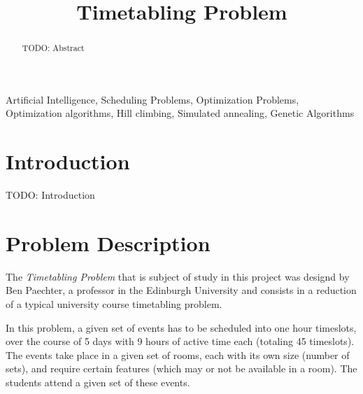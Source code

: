 \documentclass[conference]{IEEEtran}
\begin{document}
\title{Timetabling Problem}

\author{
\and
{}
\and
{}
}

\maketitle

\begin{abstract}
TODO: Abstract
\end{abstract}

\begin{IEEEkeywords}
Artificial Intelligence, Scheduling Problems, Optimization Problems, Optimization algorithms, Hill climbing, Simulated annealing, Genetic Algorithms
\end{IEEEkeywords}

\section{Introduction}

TODO: Introduction

\section{Problem Description}

The \textit{Timetabling Problem} that is subject of study in this project was designd by Ben Paechter, a professor in the Edinburgh University and consists in a reduction of a typical university course timetabling problem.

In this problem, a given set of events has to be scheduled into one hour timeslots, over the course of 5 days with 9 hours of active time each (totaling 45 timeslots). The events take place in a given set of rooms, each with its own size (number of sets), and require certain features (which may or not be available in a room). The students attend a given set of these events. 
\end{document}
